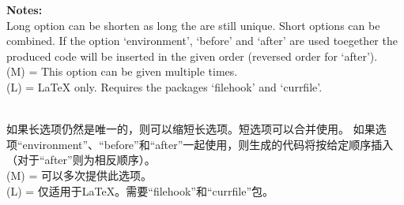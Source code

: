 \documentclass{article}
\begin{document}
\noindent \textbf{Notes:}\\
Long option can be shorten as long the are still unique.  Short options can be combined.
If the option `environment', `before' and `after' are used toegether the
produced code will be inserted in the given order (reversed order for `after').\\
(M) = This option can be given multiple times.\\
(L) = LaTeX only. Requires the packages `filehook' and `currfile'.

\\
如果长选项仍然是唯一的，则可以缩短长选项。短选项可以合并使用。
如果选项“environment”、“before”和“after”一起使用，则生成的代码将按给定顺序插入（对于“after”则为相反顺序）。\\
(M) = 可以多次提供此选项。\\
(L) = 仅适用于LaTeX。需要“filehook”和“currfile”包。




\end{document}
